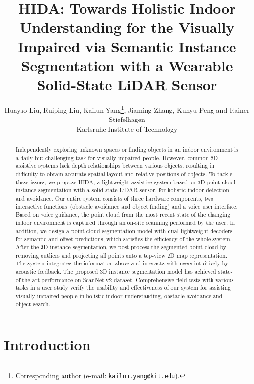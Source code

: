 \documentclass[10pt,twocolumn,letterpaper]{article}
\begin{document}
\title{HIDA: Towards Holistic Indoor Understanding for the Visually Impaired via Semantic Instance Segmentation with a Wearable Solid-State LiDAR Sensor}

\author{Huayao Liu, Ruiping Liu, Kailun Yang\thanks{Corresponding author (e-mail: {\tt kailun.yang@kit.edu}).}, Jiaming Zhang, Kunyu Peng and Rainer Stiefelhagen\\
Karlsruhe Institute of Technology
}

\maketitle
\ificcvfinal\thispagestyle{empty}\fi

\begin{abstract} 
Independently exploring unknown spaces or finding objects in an indoor environment is a daily but challenging task for visually impaired people. However, common 2D assistive systems lack depth relationships between various objects, resulting in difficulty to obtain accurate spatial layout and relative positions of objects. To tackle these issues, we propose HIDA, a lightweight assistive system based on 3D point cloud instance segmentation with a solid-state LiDAR sensor, for holistic indoor detection and avoidance. Our entire system consists of three hardware components, two interactive functions~(obstacle avoidance and object finding) and a voice user interface. Based on voice guidance, the point cloud from the most recent state of the changing indoor environment is captured through an on-site scanning performed by the user. In addition, we design a point cloud segmentation model with dual lightweight decoders for semantic and offset predictions, which satisfies the efficiency of the whole system. After the 3D instance segmentation, we post-process the segmented point cloud by removing outliers and projecting all points onto a top-view 2D map representation. The system integrates the information above and interacts with users intuitively by acoustic feedback. The proposed 3D instance segmentation model has achieved state-of-the-art performance on ScanNet v2 dataset. Comprehensive field tests with various tasks in a user study verify the usability and effectiveness of our system for assisting visually impaired people in holistic indoor understanding, obstacle avoidance and object search. 
\end{abstract}

\section{Introduction}
\end{document}
